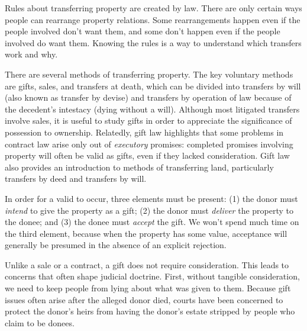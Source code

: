 Rules about transferring property are created by law.  There are only certain
ways people can rearrange property relations.  Some rearrangements happen even
if the people involved don't want them, and some don't happen even if the
people involved do want them.  Knowing the rules is a way to understand which
transfers work and why.

There are several methods of transferring property.  The key voluntary methods
are gifts, sales, and transfers at death, which can be divided  into transfers
by will (also known as transfer by devise) and transfers by operation of law
because of the decedent's intestacy (dying without a will).  Although most
litigated transfers involve sales, it is useful to study gifts in order to
appreciate the significance of possession to ownership.  Relatedly, gift law
highlights that some problems in contract law arise only out of
\textit{executory} promises: completed promises involving property will often
be valid as gifts, even if they lacked consideration.  Gift law also provides
an introduction to methods of transferring land, particularly transfers by deed
and transfers by will. 

In order for a valid  to occur, three elements must be present: (1)
the
donor must \textit{intend} to give the property as a gift; (2) the donor must
\textit{deliver} the property to the donee; and (3) the donee must
\textit{accept} the gift.  We won't spend much time on the third element,
because when the property has some value, acceptance will generally be presumed
in the absence of an explicit rejection. 

Unlike a sale or a contract, a gift does not require consideration. This leads
to concerns that often shape judicial doctrine.  First, without tangible
consideration, we need to keep people from lying about what was given to them. 
Because gift issues often arise after the alleged donor died, courts have been
concerned to protect the donor's heirs from having the donor's estate stripped
by people who claim to be donees. 

